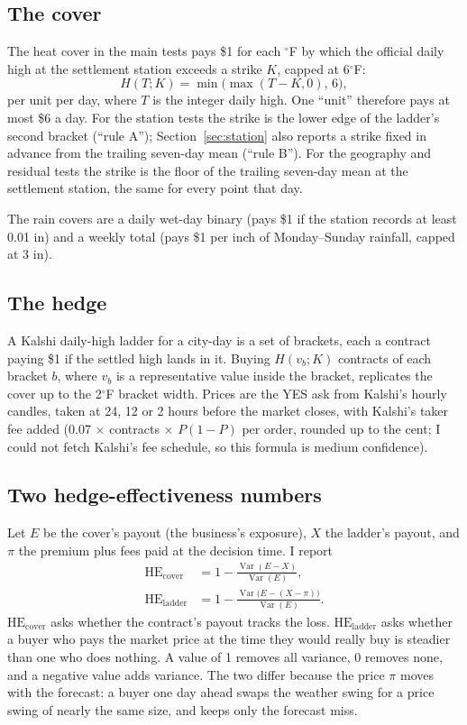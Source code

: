\documentclass[11pt]{article}
\newcommand{\HEcov}{\mathrm{HE}_{\mathrm{cover}}}
\newcommand{\HElad}{\mathrm{HE}_{\mathrm{ladder}}}
\newcommand{\degF}{\ensuremath{^\circ}F}
\begin{document}
\subsection{The cover}

The heat cover in the main tests pays \$1 for each \degF{} by which the official daily high at the settlement station exceeds a strike $K$, capped at 6\degF{}:
\begin{equation}
H(T;K) = \min\bigl(\max(T - K, 0),\, 6\bigr),
\end{equation}
per unit per day, where $T$ is the integer daily high. One ``unit'' therefore pays at most \$6 a day. For the station tests the strike is the lower edge of the ladder's second bracket (``rule A''); Section~\ref{sec:station} also reports a strike fixed in advance from the trailing seven-day mean (``rule B''). For the geography and residual tests the strike is the floor of the trailing seven-day mean at the settlement station, the same for every point that day.

The rain covers are a daily wet-day binary (pays \$1 if the station records at least 0.01 in) and a weekly total (pays \$1 per inch of Monday--Sunday rainfall, capped at 3 in).

\subsection{The hedge}

A Kalshi daily-high ladder for a city-day is a set of brackets, each a contract paying \$1 if the settled high lands in it. Buying $H(v_b;K)$ contracts of each bracket $b$, where $v_b$ is a representative value inside the bracket, replicates the cover up to the 2\degF{} bracket width. Prices are the YES ask from Kalshi's hourly candles, taken at 24, 12 or 2 hours before the market closes, with Kalshi's taker fee added (0.07 $\times$ contracts $\times$ $P(1-P)$ per order, rounded up to the cent; I could not fetch Kalshi's fee schedule, so this formula is medium confidence).

\subsection{Two hedge-effectiveness numbers}

Let $E$ be the cover's payout (the business's exposure), $X$ the ladder's payout, and $\pi$ the premium plus fees paid at the decision time. I report
\begin{align}
\HEcov &= 1 - \frac{\operatorname{Var}(E - X)}{\operatorname{Var}(E)}, \\
\HElad &= 1 - \frac{\operatorname{Var}\bigl(E - (X - \pi)\bigr)}{\operatorname{Var}(E)}.
\end{align}
$\HEcov$ asks whether the contract's payout tracks the loss. $\HElad$ asks whether a buyer who pays the market price at the time they would really buy is steadier than one who does nothing. A value of 1 removes all variance, 0 removes none, and a negative value adds variance. The two differ because the price $\pi$ moves with the forecast: a buyer one day ahead swaps the weather swing for a price swing of nearly the same size, and keeps only the forecast miss.
\end{document}
